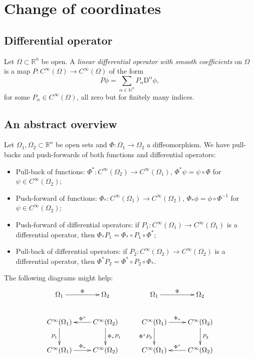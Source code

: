 \documentclass[a4paper,9pt]{amsart}
\newcommand{\N}{\mathbb{N}}	%
\newcommand{\R}{\mathbb{R}}	%
\newcommand{\Diff}{\mathrm{D}}
\newcommand{\spt}{\mathrm{spt}}
\theoremstyle{plain}
\theoremstyle{definition}
\theoremstyle{remark}
\begin{document}
\section{Change of coordinates}

\subsection{Differential operator}\label{subs67d7dce6}
Let $\Omega\subset\R^n$ be open.
A \emph{linear differential operator with smooth coefficients} on $\Omega$ is a map $P:C^\infty(\Omega) \to C^\infty(\Omega)$ of the form
\begin{equation}
	P\phi = \sum_{\alpha\in\N^n} P_\alpha \Diff^\alpha \phi ,
\end{equation}
for some $P_\alpha\in C^\infty(\Omega)$, all zero but for finitely many indices.


\subsection{An abstract overview}\label{subs67d7dc9c}
Let $\Omega_1,\Omega_2\subset\R^n$ be open sets and $\Phi:\Omega_1\to\Omega_2$ a diffeomorphism.
We have pull-backs and push-forwards of both functions and differential operators:
\begin{itemize}
\item	Pull-back of functions: $\Phi^*:C^\infty(\Omega_2)\to C^\infty(\Omega_1)$, $\Phi^*\psi = \psi\circ\Phi$ for $\psi\in C^\infty(\Omega_2)$;
\item	Push-forward of functions: $\Phi_*:C^\infty(\Omega_1)\to C^\infty(\Omega_2)$, $\Phi_*\phi = \phi\circ\Phi^{-1}$ for $\psi\in C^\infty(\Omega_2)$;
\item	Push-forward of differential operators: if $P_1:C^\infty(\Omega_1)\to C^\infty(\Omega_1)$ is a differential operator, then $\Phi_*P_1 = \Phi_*\circ P_1 \circ \Phi^*$;
\item	Pull-back of differential operators: if $P_2:C^\infty(\Omega_2)\to C^\infty(\Omega_2)$ is a differential operator, then $\Phi^*P_2 = \Phi^*\circ P_2 \circ \Phi_*$.
\end{itemize}
The following diagrams might help:
\begin{equation}\label{eq67d7e093}
	\xymatrix{
	\Omega_1 \ar[r]^{\Phi} & \Omega_2 \\
	C^\infty(\Omega_1)\ar[d]_{P_1} & C^\infty(\Omega_2) \ar[l]_{\Phi^*}\ar[d]^{\Phi_*P_1} \\
	C^\infty(\Omega_1)\ar[r]^{\Phi_*} & C^\infty(\Omega_2) \\
	}
	\qquad
	\xymatrix{
	\Omega_1 \ar[r]^{\Phi} & \Omega_2 \\
	C^\infty(\Omega_1)\ar[d]_{\Phi^*P_2}\ar[r]^{\Phi_*} & C^\infty(\Omega_2) \ar[d]^{P_2} \\
	C^\infty(\Omega_1) & C^\infty(\Omega_2)\ar[l]_{\Phi^*} \\
	}
\end{equation}
\end{document}
